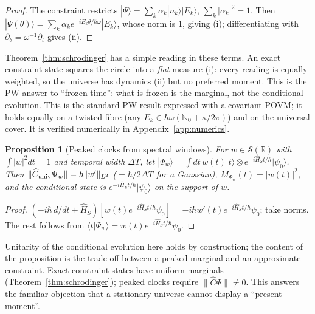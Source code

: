 \documentclass[aps,prd,onecolumn,notitlepage,10pt,amsmath,amssymb,amsfonts,nofootinbib]{revtex4-2}
\newtheorem{proposition}{Proposition}
\theoremstyle{definition}
\theoremstyle{remark}
\newcommand{\Hs}{\widehat{H}_S}
\newcommand{\Cop}{\widehat{C}}
\newcommand{\R}{\mathbb{R}}
\newcommand{\N}{\mathbb{N}}
\begin{document}
\begin{proof}
The constraint restricts $|\Psi\rangle=\sum_k\alpha_k|n_k\rangle|E_k\rangle$, $\sum_k|\alpha_k|^2=1$. Then $|\Psi(\theta)\rangle=\sum_k\alpha_ke^{-iE_k\theta/\hbar\omega}|E_k\rangle$, whose norm is $1$, giving (i); differentiating with $\partial_\theta=\omega^{-1}\partial_t$ gives (ii).
\end{proof}

Theorem~\ref{thm:schrodinger} has a simple reading in these terms. An exact constraint state squares the circle into a \emph{flat} measure (i): every reading is equally weighted, so the universe has dynamics (ii) but no preferred moment. This is the PW answer to ``frozen time'': what is frozen is the marginal, not the conditional evolution. This is the standard PW result expressed with a covariant POVM; it holds equally on a twisted fibre (any $E_k\in\hbar\omega(\N_0+\kappa/2\pi)$) and on the universal cover. It is verified numerically in Appendix~\ref{app:numerics}.

\begin{proposition}[Peaked clocks from spectral windows]
\label{prop:window}
For $w\in\mathcal S(\R)$ with $\int|w|^2dt=1$ and temporal width $\Delta T$, let $|\Psi_w\rangle=\int dt\,w(t)|t\rangle\otimes e^{-i\Hs t/\hbar}|\psi_0\rangle$. Then $\|\Cop_{\rm univ}\Psi_w\|=\hbar\|w'\|_{L^2}$ ($=\hbar/2\Delta T$ for a Gaussian), $M_{\Psi_w}(t)=|w(t)|^2$, and the conditional state is $e^{-i\Hs t/\hbar}|\psi_0\rangle$ on the support of $w$.
\end{proposition}

\begin{proof}
$(-i\hbar\,d/dt+\Hs)[w(t)e^{-i\Hs t/\hbar}\psi_0]=-i\hbar w'(t)e^{-i\Hs t/\hbar}\psi_0$; take norms. The rest follows from $\langle t|\Psi_w\rangle=w(t)e^{-i\Hs t/\hbar}\psi_0$.
\end{proof}

Unitarity of the conditional evolution here holds by construction; the content of the proposition is the trade-off between a peaked marginal and an approximate constraint. Exact constraint states have uniform marginals (Theorem~\ref{thm:schrodinger}); peaked clocks require $\|\Cop\Psi\|\neq0$. This answers the familiar objection that a stationary universe cannot display a ``present moment''.
\end{document}
